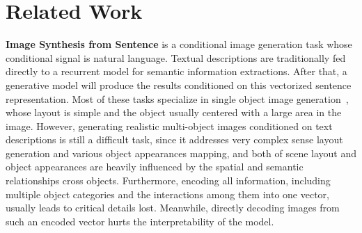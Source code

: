 \section{Related Work}


\textbf{Image Synthesis from Sentence} is a conditional image generation task whose conditional signal is natural language. Textual descriptions are traditionally fed directly to a recurrent model for semantic information extractions. After that, a generative model will produce the results conditioned on this vectorized sentence representation. Most of these tasks specialize in single object image generation~\cite{reed2016generative,zhang2017stackgan,xu2018attngan}, whose layout is simple and the object usually centered with a large area in the image. However, generating realistic multi-object images conditioned on text descriptions is still a difficult task, since it addresses very complex sense layout generation and various object appearances mapping, and both of scene layout and object appearances are heavily influenced by the spatial and semantic relationships cross objects. Furthermore, encoding all information, including multiple object categories and the interactions among them into one vector, usually leads to critical details lost. Meanwhile, directly decoding images from such an encoded vector hurts the interpretability of the model.

